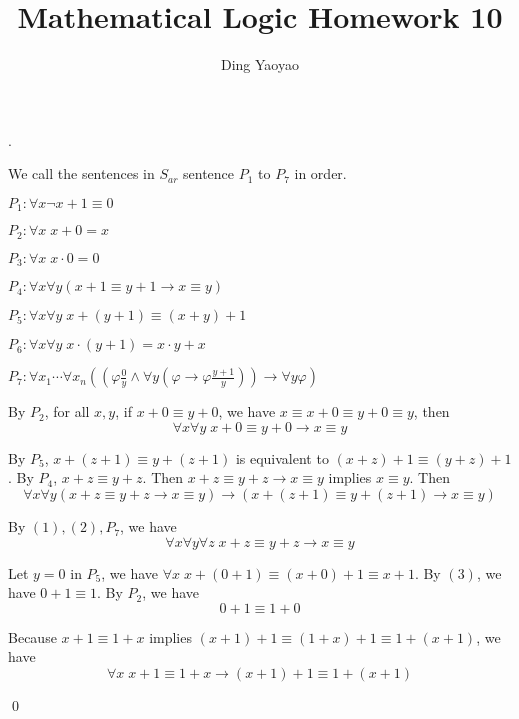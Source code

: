 \documentclass[10pt,a4paper]{article}
\author{Ding Yaoyao}
\title{Mathematical Logic Homework 10}
\newenvironment{sol}[1]
{\par\vspace{3mm}\noindent{\it Solution #1}.}
{\qed}
\begin{document}
	\maketitle
	
	\begin{sol}{10.1}
		
		We call the sentences in $S_{ar}$ sentence $P_1$ to $P_7$ in order.
		
		$P_1: \forall x\neg x+1\equiv0$
		
		$P_2: \forall x\;x+0=x$
		
		$P_3: \forall x\;x\cdot0=0$
		
		$P_4: \forall x\forall y(x+1\equiv y+1 \rightarrow x\equiv y)$
		
		$P_5: \forall x\forall y\;x+(y+1) \equiv (x+y)+1$
		
		$P_6: \forall x\forall y\;x\cdot (y+1) = x\cdot y + x$
		
		$P_7: \forall x_1 \cdots\forall x_n \left( \left(\varphi\frac{0}{y}\wedge\forall y(\varphi\rightarrow\varphi\frac{y+1}{y})\right)\rightarrow \forall y \varphi \right)$
		
		By $P_2$, for all $x, y$, if $x+0 \equiv y+0$, we have $x \equiv x+0 \equiv y+0 \equiv y$, then
		\begin{equation}
			\forall x\forall y\;x+0\equiv y+0\rightarrow x\equiv y
		\end{equation}
		
		By $P_5$, $x+(z+1)\equiv y+(z+1)$ is equivalent to $(x+z)+1\equiv (y+z)+1$. By $P_4$, $x+z\equiv y+z$. Then $x+z\equiv y+z\rightarrow x\equiv y$ implies $x \equiv y$. Then
		\begin{equation}
			\forall x \forall y (x+z\equiv y+z\rightarrow x\equiv y)\rightarrow (x+(z+1)\equiv y+(z+1)\rightarrow x\equiv y)
		\end{equation}
		
		By $(1), (2), P_7$, we have
		\begin{equation}
			\forall x\forall y\forall z\;x+z\equiv y+z\rightarrow x\equiv y
		\end{equation}
		
		Let $y = 0$ in $P_5$, we have $\forall x\; x+(0+1)\equiv (x+0)+1 \equiv x + 1$. By $(3)$, we have $0+1 \equiv 1$. By $P_2$, we have
		\begin{equation}
			0+1 \equiv 1+0
		\end{equation}
		
		Because $x+1\equiv 1+x$ implies $(x+1)+1 \equiv (1+x)+1 \equiv 1+(x+1)$, we have
		\begin{equation}
			\forall x\;x+1\equiv 1+x\rightarrow (x+1)+1\equiv 1+(x+1)
		\end{equation}
		

\end{sol}
\end{document}
